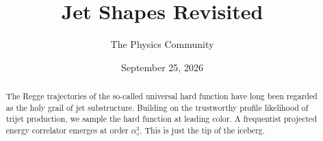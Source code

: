 \documentclass[11pt]{article}
\title{Jet Shapes Revisited}
\author{The Physics Community}
\date{September 25, 2026}
\numberwithin{equation}{section}
\theoremstyle{definition}
\theoremstyle{remark}
\begin{document}
\maketitle
\begin{abstract}
The Regge trajectories of the so-called universal hard function have
long been regarded as the holy grail of jet substructure. Building on
the trustworthy profile likelihood of trijet production, we sample the
hard function at leading color. A frequentist projected energy
correlator emerges at order $\alpha_s^3$. This is just the tip of the
iceberg.
\end{abstract}
\tableofcontents





\nocite{*}


\end{document}
